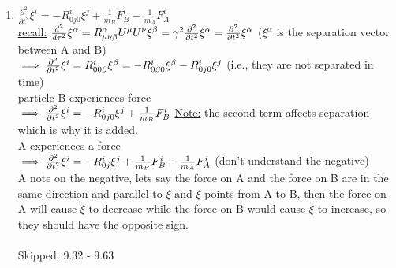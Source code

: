 \documentclass[12pt]{amsart}
\begin{document}
\begin{enumerate}
\item \underline{$\frac{\partial^2}{\partial t^2} \xi^i = - R^i_{0j0} \xi^j + \frac{1}{m_B} F_B^i - \frac{1}{m_A} F_A^i$}\\
\underline{recall:} $\frac{d^2}{d \tau^2} \xi^{\alpha} = R^{\alpha}_{\mu \nu \beta} U^{\mu} U^{\nu} \xi^{\beta} = \gamma^2 \frac{\partial^2}{\partial t^2} \xi^{\alpha} = \frac{\partial^2}{\partial t^2} \xi^{\alpha}\\$
($\xi^{\alpha}$ is the separation vector between A and B)\\
$\implies \frac{\partial^2}{\partial t^2} \xi^i = R^i_{00 \beta} \xi^{\beta} = - R^i_{0 \beta 0} \xi^{\beta} - R^i_{0j0} \xi^j\\$
(i.e., they are not separated in time)\\
particle B experiences force\\
$\implies \frac{\partial^2}{\partial t^2} \xi^i = - R^i _{0j0} \xi^j +\frac{1}{m_B} F_B^i\\$
\underline{Note:} the second term affects separation which is why it is added.\\
A experiences a force\\
$\implies \frac{\partial^2}{\partial t^2} \xi^i = -R^i_{0j} \xi^j + \frac{1}{m_B} F_B^i - \frac{1}{m_A} F_A^i\\$
(don't understand the negative)\\
A note on the negative, lets say the force on A and the force on B are in the same direction and parallel to $\xi$ and $\xi$ points from A to B, then the force on A will cause $\dot{\xi}$ to decrease while the force on B would cause $\dot{\xi}$ to increase, so they should have the opposite sign.\\


\hdashrule[0.5ex][c]{\linewidth}{0.5pt}{1.5mm}\\

Skipped: 9.32 - 9.63\\


\hdashrule[0.5ex][c]{\linewidth}{0.5pt}{1.5mm}\\



\end{enumerate}
\end{document}
